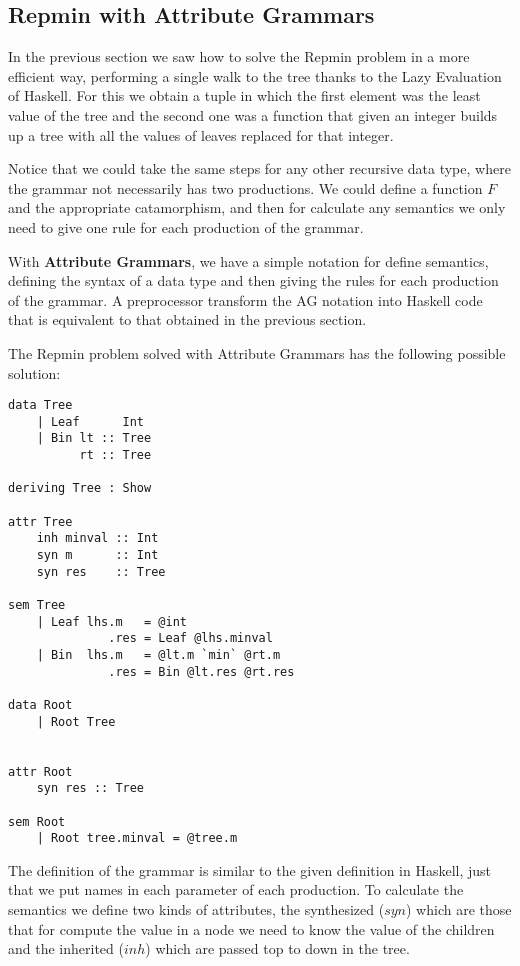 \documentclass[a4paper,10pt]{article}
\begin{document}
  


\subsection{Repmin with Attribute Grammars}

In the previous section we saw how to solve the Repmin problem in a more efficient way, performing
a single walk to the tree thanks to the Lazy Evaluation of Haskell. For this we obtain a tuple in
which the first element was the least value of the tree and the second one was a function that
given an integer builds up a tree with all the values of leaves replaced for
that integer.

Notice that we could take the same steps for any other recursive data type, where the grammar
not necessarily has two productions. We could define a function $F$ and the appropriate catamorphism,
and then for calculate any semantics we only need to give one rule for each production of the
grammar.

With \textbf{Attribute Grammars}, we have a simple notation for define semantics, defining the
syntax of a data type and then giving the rules for each production of the grammar. A preprocessor
transform the AG notation into Haskell code that is equivalent to that obtained in the previous
section.

The Repmin problem solved with Attribute Grammars has the following possible solution:

\begin{lstlisting}
data Tree
    | Leaf      Int
    | Bin lt :: Tree
	      rt :: Tree

deriving Tree : Show
	  
attr Tree
    inh minval :: Int
    syn m      :: Int
    syn res    :: Tree
      
sem Tree
    | Leaf lhs.m   = @int
              .res = Leaf @lhs.minval
	| Bin  lhs.m   = @lt.m `min` @rt.m
              .res = Bin @lt.res @rt.res

data Root
	| Root Tree
      
      
attr Root
	syn res :: Tree
      
sem Root
	| Root tree.minval = @tree.m
\end{lstlisting}

The definition of the grammar is similar to the given definition in Haskell, just that we put names
in each parameter of each production. To calculate the semantics we define two kinds of attributes,
the synthesized ($syn$) which are those that for compute the value in a node we need to know the value
of the children and the inherited ($inh$) which are passed top to down in the tree.
\end{document}
